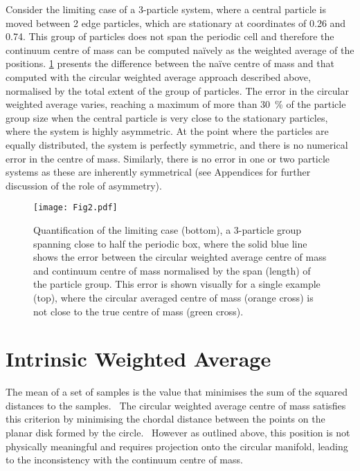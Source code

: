\documentclass[reprint,superscriptaddress,nobibnotes,amsmath,amssymb,aip]{revtex4-2}
\begin{document}
Consider the limiting case of a 3-particle system, where a central particle is moved between 2 edge particles, which are stationary at coordinates of 0.26 and 0.74. 
This group of particles does not span the periodic cell and therefore the continuum centre of mass can be computed naïvely as the weighted average of the positions. 
\cref{fig:error_quantification} presents the difference between the naïve centre of mass and that computed with the circular weighted average approach described above, normalised by the total extent of the group of particles. 
The error in the circular weighted average varies, reaching a maximum of more than \SI{30}{\percent} of the particle group size when the central particle is very close to the stationary particles, where the system is highly asymmetric. 
At the point where the particles are equally distributed, the system is perfectly symmetric, and there is no numerical error in the centre of mass. 
Similarly, there is no error in one or two particle systems as these are inherently symmetrical (see Appendices for further discussion of the role of asymmetry). 
%
\begin{figure}
    \centering
    \texttt{[image: Fig2.pdf]}
    \caption{Quantification of the limiting case (bottom), a 3-particle group spanning close to half the periodic box, where the solid blue line shows the error between the circular weighted average centre of mass and continuum centre of mass normalised by the span (length) of the particle group.
    This error is shown visually for a single example (top), where the circular averaged centre of mass (orange cross) is not close to the true centre of mass (green cross).}
    \label{fig:error_quantification}
\end{figure}
%

\section{Intrinsic Weighted Average}

The mean of a set of samples is the value that minimises the sum of the squared distances to the samples.~\cite{neilsen_matrix_2012}
The circular weighted average centre of mass satisfies this criterion by minimising the chordal distance between the points on the planar disk formed by the circle.~\cite{hotz_non-asymptotic_2016}
However as outlined above, this position is not physically meaningful and requires projection onto the circular manifold, leading to the inconsistency with the continuum centre of mass.
\end{document}
